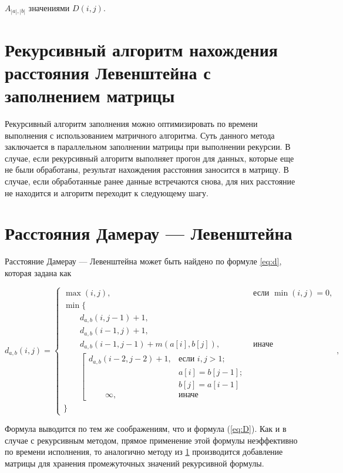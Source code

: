 \documentclass[12pt]{report}
\begin{document}
$A_{|a|,|b|}$ значениями $D(i, j)$.


\section{Рекурсивный алгоритм нахождения расстояния Левенштейна с заполнением матрицы}

\label{sec:recmat}


Рекурсивный алгоритм заполнения можно оптимизировать по времени выполнения с использованием матричного алгоритма. Суть данного метода заключается в параллельном заполнении матрицы при выполнении рекурсии. В случае, если рекурсивный алгоритм выполняет прогон для данных, которые еще не были обработаны, результат нахождения расстояния заносится в матрицу. В случае, если обработанные ранее данные встречаются снова, для них расстояние не находится и алгоритм переходит к следующему шагу.


\section{Расстояния Дамерау — Левенштейна}

Расстояние Дамерау — Левенштейна может быть найдено по формуле \ref{eq:d}, которая задана как

\begin{equation}
\label{eq:d}
d_{a,b}(i, j) = \begin{cases}
\max(i, j), &\text{если }\min(i, j) = 0,\\
\min \lbrace \\
\qquad d_{a,b}(i, j-1) + 1,\\
\qquad d_{a,b}(i-1, j) + 1,\\
\qquad d_{a,b}(i-1, j-1) + m(a[i], b[j]), &\text{иначе}\\
\qquad \left[ \begin{array}{cc}d_{a,b}(i-2, j-2) + 1, &\text{если }i,j > 1;\\
\qquad &\text{}a[i] = b[j-1]; \\
\qquad &\text{}b[j] = a[i-1]\\
\qquad \infty, & \text{иначе}\end{array}\right.\\
\rbrace
\end{cases},
\end{equation}

Формула выводится по тем же соображениям, что и формула (\ref{eq:D}).
Как и в случае с рекурсивным методом, прямое применение этой формулы неэффективно по времени исполнения, то аналогично методу из \ref{sec:recmat} производится добавление матрицы для хранения промежуточных значений рекурсивной формулы.
\end{document}

